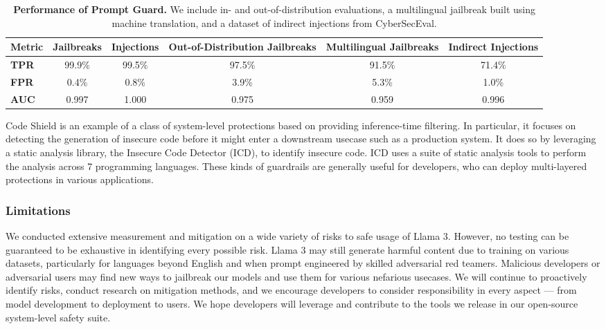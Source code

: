 \documentclass[dvipsnames]{fairmeta}
\begin{document}
\begin{table}[t]
\centering
    \begin{tabular}{lccccc}
    \toprule
      \textbf{Metric} & \textbf{Jailbreaks} & \textbf{Injections} & \textbf{Out-of-Distribution Jailbreaks} & \textbf{Multilingual Jailbreaks} & \textbf{Indirect Injections}  \\
    \midrule
    \textbf{TPR} & 99.9\% & 99.5\% & 97.5\% & 91.5\% & 71.4\% \\
    \textbf{FPR} & 0.4\% & 0.8\% & 3.9\% & 5.3\% & 1.0\% \\
    \textbf{AUC} & 0.997 & 1.000 & 0.975 & 0.959 & 0.996 \\
    \bottomrule
    \end{tabular}
    \caption{\textbf{Performance of Prompt Guard.} We include in- and out-of-distribution evaluations, a multilingual jailbreak built using machine translation, and a dataset of indirect injections from CyberSecEval.}
    \label{table:prompt_guard_results}
\end{table}

Code Shield is an example of a class of system-level protections based on providing inference-time filtering. In particular, it focuses on detecting the generation of insecure code before it might enter a downstream usecase such as a production system. It does so by leveraging a static analysis library, the Insecure Code Detector (ICD), to identify insecure code. ICD uses a suite of static analysis tools to perform the analysis across 7 programming languages. These kinds of guardrails are generally useful for developers, who can deploy multi-layered protections in various applications.

\subsubsection{Limitations}

We conducted extensive measurement and mitigation on a wide variety of risks to safe usage of Llama 3. However, no testing can be guaranteed to be exhaustive in identifying every possible risk. Llama 3 may still generate harmful content due to training on various datasets, particularly for languages beyond English and when prompt engineered by skilled adversarial red teamers. Malicious developers or adversarial users may find new ways to jailbreak our models and use them for various nefarious usecases. We will continue to proactively identify risks, conduct research on mitigation methods, and we encourage developers to consider responsibility in every aspect --- from model development to deployment to users. We hope developers will leverage and contribute to the tools we release in our open-source system-level safety suite. 
\end{document}
